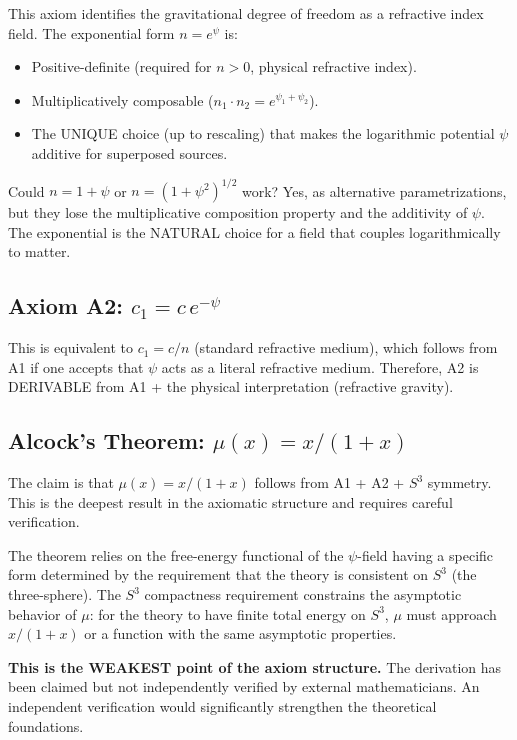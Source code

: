 \documentclass[11pt]{article}
\begin{document}
This axiom identifies the gravitational degree of freedom as a
refractive index field.  The exponential form $n = e^\psi$ is:
\begin{itemize}
\item Positive-definite (required for $n > 0$, physical refractive index).
\item Multiplicatively composable ($n_1 \cdot n_2 = e^{\psi_1 + \psi_2}$).
\item The UNIQUE choice (up to rescaling) that makes the logarithmic
  potential $\psi$ additive for superposed sources.
\end{itemize}

Could $n = 1 + \psi$ or $n = (1 + \psi^2)^{1/2}$ work?  Yes, as
alternative parametrizations, but they lose the multiplicative
composition property and the additivity of $\psi$.  The exponential
is the NATURAL choice for a field that couples logarithmically to
matter.

\subsection{Axiom A2: $c_1 = c\,e^{-\psi}$}

This is equivalent to $c_1 = c/n$ (standard refractive medium), which
follows from A1 if one accepts that $\psi$ acts as a literal refractive
medium.  Therefore, A2 is DERIVABLE from A1 + the physical interpretation
(refractive gravity).

\subsection{Alcock's Theorem: $\mu(x) = x/(1+x)$}

The claim is that $\mu(x) = x/(1+x)$ follows from A1 + A2 + $S^3$
symmetry.  This is the deepest result in the axiomatic structure and
requires careful verification.

The theorem relies on the free-energy functional of the $\psi$-field
having a specific form determined by the requirement that the theory
is consistent on $S^3$ (the three-sphere).  The $S^3$ compactness
requirement constrains the asymptotic behavior of $\mu$: for the
theory to have finite total energy on $S^3$, $\mu$ must approach
$x/(1+x)$ or a function with the same asymptotic properties.

\textbf{This is the WEAKEST point of the axiom structure.}  The
derivation has been claimed but not independently verified by
external mathematicians.  An independent verification would
significantly strengthen the theoretical foundations.
\end{document}
